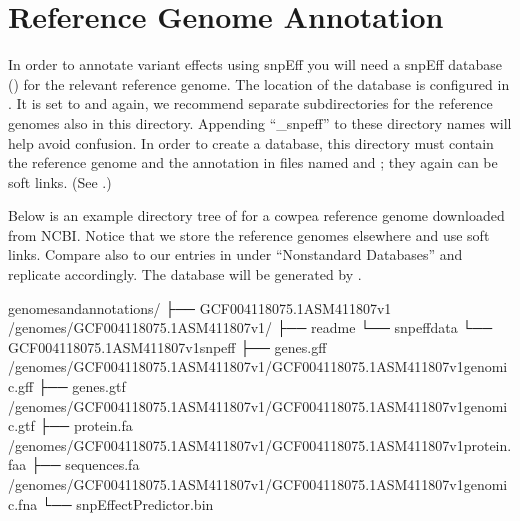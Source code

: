 \documentclass[letterpaper,10pt,english]{sphinxmanual}
\begin{document}
\section{Reference Genome Annotation}
\label{\detokenize{index:reference-genome-annotation}}
In order to annotate variant effects using snpEff you will need a snpEff database () for the relevant reference genome. The location of the  database is configured in . It is set to  and again, we recommend separate subdirectories for the reference genomes also in this directory. Appending “\_snpeff” to these directory names will help avoid confusion. In order to create a  database, this  directory must contain the reference genome and the annotation in files named  and ; they again can be soft links. (See .)

Below is an example directory tree of  for a cowpea reference genome downloaded from NCBI. Notice that we store the reference genomes elsewhere and use soft links. Compare also to our entries in  under “Non\sphinxhyphen{}standard Databases” and replicate accordingly. The database  will be generated by .

\begin{sphinxVerbatim}[commandchars=\\\{\}]
genomes\PYGZus{}and\PYGZus{}annotations/
├── GCF\PYGZus{}004118075.1\PYGZus{}ASM411807v1 \PYGZhy{}\PYGZgt{} \PYGZti{}/genomes/GCF\PYGZus{}004118075.1\PYGZus{}ASM411807v1/
├── readme
└── snpeffdata
    └── GCF\PYGZus{}004118075.1\PYGZus{}ASM411807v1\PYGZus{}snpeff
        ├── genes.gff \PYGZhy{}\PYGZgt{} \PYGZti{}/genomes/GCF\PYGZus{}004118075.1\PYGZus{}ASM411807v1/GCF\PYGZus{}004118075.1\PYGZus{}ASM411807v1\PYGZus{}genomic.gff
        ├── genes.gtf \PYGZhy{}\PYGZgt{} \PYGZti{}/genomes/GCF\PYGZus{}004118075.1\PYGZus{}ASM411807v1/GCF\PYGZus{}004118075.1\PYGZus{}ASM411807v1\PYGZus{}genomic.gtf
        ├── protein.fa \PYGZhy{}\PYGZgt{} \PYGZti{}/genomes/GCF\PYGZus{}004118075.1\PYGZus{}ASM411807v1/GCF\PYGZus{}004118075.1\PYGZus{}ASM411807v1\PYGZus{}protein.faa
        ├── sequences.fa \PYGZhy{}\PYGZgt{} \PYGZti{}/genomes/GCF\PYGZus{}004118075.1\PYGZus{}ASM411807v1/GCF\PYGZus{}004118075.1\PYGZus{}ASM411807v1\PYGZus{}genomic.fna
        └── snpEffectPredictor.bin
\end{sphinxVerbatim}
\end{document}
